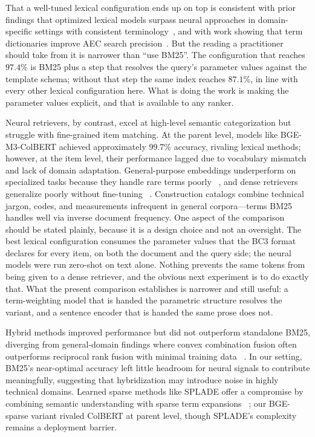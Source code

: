 \documentclass[preprint,12pt]{elsarticle}
\begin{document}
That a well-tuned lexical configuration ends up on top is consistent with prior findings that optimized lexical models surpass neural approaches in domain-specific settings with consistent terminology~\cite{thakur2021beir}, and with work showing that term dictionaries improve AEC search precision~\cite{fan2015project}. But the reading a practitioner should take from it is narrower than ``use BM25''. The configuration that reaches $97.4\%$ is BM25 plus a step that resolves the query's parameter values against the template schema; without that step the same index reaches $87.1\%$, in line with every other lexical configuration here. What is doing the work is making the parameter values explicit, and that is available to any ranker.

Neural retrievers, by contrast, excel at high-level semantic categorization but struggle with fine-grained item matching. At the parent level, models like BGE-M3-ColBERT achieved approximately 99.7\% accuracy, rivaling lexical methods; however, at the item level, their performance lagged due to vocabulary mismatch and lack of domain adaptation. General-purpose embeddings underperform on specialized tasks because they handle rare terms poorly ~\cite{tang2024we}, and dense retrievers generalize poorly without fine-tuning ~\cite{li2022domain}. Construction catalogs combine technical jargon, codes, and measurements infrequent in general corpora—terms BM25 handles well via inverse document frequency. One aspect of the comparison should be stated plainly, because it is a design choice and not an oversight. The best lexical configuration consumes the parameter values that the BC3 format declares for every item, on both the document and the query side; the neural models were run zero-shot on text alone. Nothing prevents the same tokens from being given to a dense retriever, and the obvious next experiment is to do exactly that. What the present comparison establishes is narrower and still useful: a term-weighting model that is handed the parametric structure resolves the variant, and a sentence encoder that is handed the same prose does not.

Hybrid methods improved performance but did not outperform standalone BM25, diverging from general-domain findings where convex combination fusion often outperforms reciprocal rank fusion with minimal training data ~\cite{bruch2023analysis}. In our setting, BM25's near-optimal accuracy left little headroom for neural signals to contribute meaningfully, suggesting that hybridization may introduce noise in highly technical domains. Learned sparse methods like SPLADE offer a compromise by combining semantic understanding with sparse term expansions ~\cite{formal2021splade}; our BGE-sparse variant rivaled ColBERT at parent level, though SPLADE's complexity remains a deployment barrier.
\end{document}
